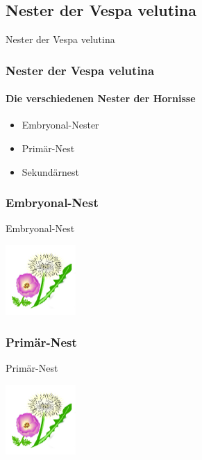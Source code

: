 \documentclass[aspectratio=169]{beamer}
\begin{document}
\subsection[Nester]{Nester der Vespa velutina}

\begin{frame}{Nester der Vespa velutina}
    \frametitle{Nester der Vespa velutina} 
    \framesubtitle{Die verschiedenen Nester der Hornisse}
    \begin{itemize} 
        \item 
            Embryonal-Nester \pause
        \item 
            Primär-Nest \pause
        \item 
            Sekundärnest 
    \end{itemize}
 
    \end{frame}

\subsubsection[Embryonal-Nest]{Embryonal-Nest}


	\begin{frame}{Embryonal-Nest}
		\begin{center}	
			\includegraphics[width=0.2\textwidth]{figures/BH-Logo_Quat.png}
		\end{center}

		\end{frame}

\subsubsection[Sekundär-Nest]{Primär-Nest}


		\begin{frame}{Primär-Nest}
			\begin{center}	
				\includegraphics[width=0.2\textwidth]{figures/BH-Logo_Quat.png}
			\end{center}
	
			\end{frame}
\end{document}
